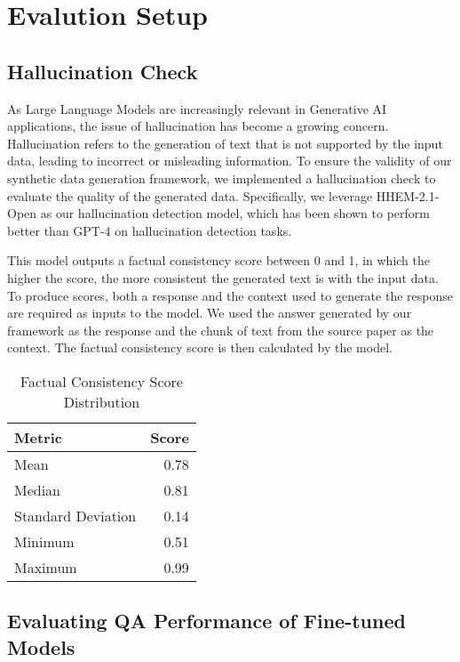 \section{Evalution Setup}\label{sec:evaluation}

\subsection{Hallucination Check}

As Large Language Models are increasingly relevant in Generative AI applications, the issue of hallucination has become a growing concern.
Hallucination refers to the generation of text that is not supported by the input data, leading to incorrect or misleading information.
To ensure the validity of our synthetic data generation framework, we implemented a hallucination check to evaluate the quality of the generated data.
Specifically, we leverage HHEM-2.1-Open %
as our hallucination detection model, which has been shown to perform better than GPT-4 on hallucination detection tasks.

This model outputs a factual consistency score between 0 and 1, in which the higher the score, the more consistent the generated text is with the input data.
To produce scores, both a response and the context used to generate the response are required as inputs to the model. We used the answer generated by
our framework as the response and the chunk of text from the source paper as the context. The factual consistency score is then calculated by the model.

\begin{table}[h]
\centering
\caption{Factual Consistency Score Distribution}
\begin{tabular}{lr}
\hline
Metric & Score \\
\hline
Mean & 0.78 \\
Median & 0.81 \\
Standard Deviation & 0.14 \\
Minimum & 0.51 \\
Maximum & 0.99 \\
\hline
\end{tabular}
\label{tab:factual-consistency-scores}
\end{table}

\subsection{Evaluating QA Performance of Fine-tuned Models}\label{sec:eval:performance}

